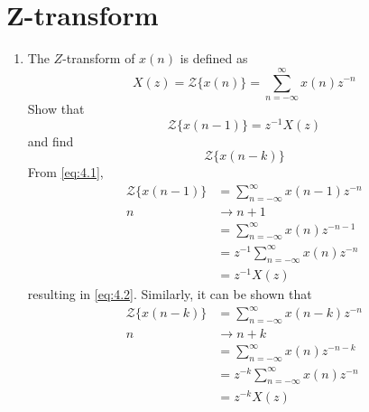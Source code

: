 \documentclass[journal,12pt,twocolumn]{IEEEtran}
\theoremstyle{remark}
\renewcommand\thesection{\arabic{section}}
\numberwithin{equation}{subsection}
\begin{document}
\section{Z-transform}
\begin{enumerate}[label=\thesection.\arabic*]
\item The $Z$-transform of $x(n)$ is defined as
\begin{equation}
\label{eq:4.1}
X(z)={\mathcal {Z}}\{x(n)\}=\sum _{n=-\infty }^{\infty }x(n)z^{-n}
\end{equation}
%
Show that
\begin{equation}
\label{eq:4.2}
{\mathcal {Z}}\{x(n-1)\} = z^{-1}X(z)
\end{equation}
and find
\begin{equation}
	{\mathcal {Z}}\{x(n-k)\} 
\end{equation}
\solution From \eqref{eq:4.1},
\begin{align}
{\mathcal {Z}}\{x(n-1)\} &=\sum _{n=-\infty }^{\infty }x(n-1)z^{-n}\\
n &\longrightarrow n+1\\ \nonumber
&=\sum _{n=-\infty }^{\infty }x(n)z^{-n-1} \\
&= z^{-1}\sum _{n=-\infty }^{\infty }x(n)z^{-n}\\
&= z^{-1}X(z)
\end{align}
resulting in \eqref{eq:4.2}. Similarly, it can be shown that
%
\begin{align}
{\mathcal {Z}}\{x(n-k)\} &=\sum _{n=-\infty }^{\infty }x(n-k)z^{-n}\\
n &\longrightarrow n+k \nonumber\\
&=\sum _{n=-\infty }^{\infty }x(n)z^{-n-k} \\
&= z^{-k}\sum _{n=-\infty }^{\infty }x(n)z^{-n}\\
&= z^{-k}X(z) \label{eq:4.11}
\end{align}


\end{enumerate}
\end{document}
